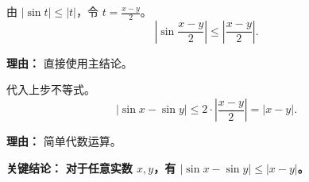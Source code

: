 \begin{examplebox}
\begin{description}[style=nextline, leftmargin=2.8em, labelsep=0.5em, itemsep=0.45em]
    \item[\textbf{第三步（应用结论）：}] 由 $|\sin t| \le |t|$，令 $t = \frac{x-y}{2}$。
    \[
    \left| \sin \frac{x-y}{2} \right| \le \left| \frac{x-y}{2} \right|.
    \]
    \par\textbf{理由：}
    直接使用主结论。

    \item[\textbf{第四步（综合得证）：}] 代入上步不等式。
    \[
    |\sin x - \sin y| \le 2 \cdot \left| \frac{x-y}{2} \right| = |x-y|.
    \]
    \par\textbf{理由：}
    简单代数运算。
\end{description}

\textbf{\textcolor{CExample}{关键结论：}} \textbf{对于任意实数 $x, y$，有 $|\sin x - \sin y| \le |x - y|$。}
\end{examplebox}
